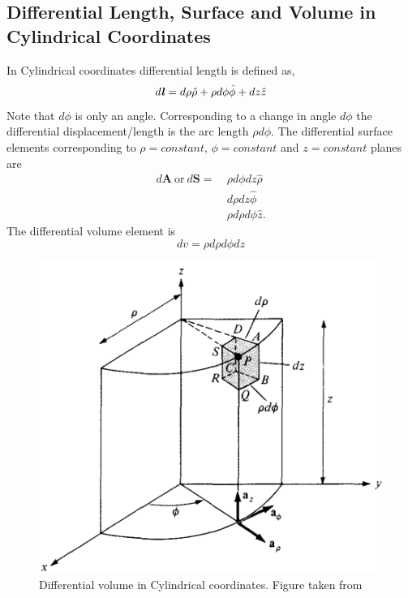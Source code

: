 \documentclass[12pt,a4paper]{article}
\begin{document}
\subsection{Differential Length, Surface and Volume in Cylindrical Coordinates}
In Cylindrical coordinates differential length is defined as,
\begin{equation}
d\textbf{\textit{l}}=d\rho\hat \rho+\rho d\phi\hat \phi+dz\hat z
\end{equation}
Note that $d\phi$ is only an angle. Corresponding to a change in angle $d\phi$ the differential displacement/length is the arc length $\rho d\phi$. The differential surface elements corresponding to $\rho=constant$, $\phi=constant$ and $z=constant$ planes are
\begin{equation}
\begin{split}
d\textbf{A}~\mathrm{or}~d\textbf{S}=~&\rho d\phi dz\hat \rho\\
&d\rho dz\hat \phi\\
&\rho d\rho d\phi\hat z.
\end{split}
\end{equation}
The differential volume element is
\begin{equation}
dv=\rho d\rho d\phi dz
\end{equation}
\begin{figure}[htb]
\centering
\includegraphics[scale=0.3]{Figure3-3S.png}
\caption{Differential volume in Cylindrical coordinates. Figure taken from~\cite[Figure 3.3, page 56]{Sadiku}}
\label{Cylindrical-differential-volume}
\end{figure}
\end{document}
